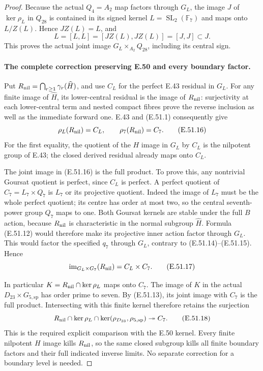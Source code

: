 \begin{proof}
Because the actual $Q_4=A_2$ map factors through $G_L$,
the image $J$ of $\ker\rho_L$ in $Q_{28}$ is contained
in its signed kernel $L=\operatorname{SL}_2(\mathbb F_7)$
and maps onto $L/Z(L)$.  Hence $JZ(L)=L$, and
\[
             L=[L,L]=[JZ(L),JZ(L)]=[J,J]\subset J.
\tag{E.51.15}
\]
This proves the actual joint image
$G_L\times_{A_2}Q_{28}$, including its central sign.

\paragraph{The complete correction preserving E.50 and every boundary factor.}
Put
$R_{\rm nil}=\bigcap_{r\ge1}\gamma_r(\widehat H)$,
and use $C_L$ for the perfect E.43 residual in $G_L$.
For any finite image of $\widehat H$, its lower-central
residual is the image of $R_{\rm nil}$: surjectivity
at each lower-central term and nested compact fibres
prove the reverse inclusion as well as the immediate
forward one.  E.43 and \textup{(E.51.1)} consequently give
\[
                   \rho_L(R_{\rm nil})=C_L,
          \qquad \rho_7(R_{\rm nil})=C_7.
\tag{E.51.16}
\]
For the first equality, the quotient of the $H$ image
in $G_L$ by $C_L$ is the nilpotent group of E.43;
the closed derived residual already maps onto $C_L$.

The joint image in \textup{(E.51.16)} is the full product.
To prove this, any nontrivial Goursat quotient is
perfect, since $C_L$ is perfect.  A perfect quotient
of $C_7=L_7\times Q_7$ is $L_7$ or its projective
quotient.  Indeed the image of $L_7$ must be the whole
perfect quotient; its centre has order at most two,
so the central seventh-power group $Q_7$ maps to one.
Both Goursat kernels are stable under the full $B$
action, because $R_{\rm nil}$ is characteristic in
the normal subgroup $\widehat H$.  Formula
\textup{(E.51.12)} would therefore make its projective
inner action factor through $G_L$.  This would factor
the specified $q_7$ through $G_L$, contrary to
\textup{(E.51.14)--(E.51.15)}.  Hence
\[
             \operatorname{im}_{G_L\times G_7}(R_{\rm nil})
                              =C_L\times C_7.
\tag{E.51.17}
\]

In particular $K=R_{\rm nil}\cap\ker\rho_L$ maps onto
$C_7$.  The image of $K$ in the actual
$D_{23}\times G_{5,\mathrm{sp}}$ has order prime to
seven.  By \textup{(E.51.13)}, its joint image with
$C_7$ is the full product.  Intersecting with this
finite kernel therefore retains the surjection
\[
 R_{\rm nil}\cap\ker\rho_L
      \cap\ker(\rho_{D_{23}},\rho_{5,\mathrm{sp}})
                      \twoheadrightarrow C_7.
\tag{E.51.18}
\]
This is the required explicit comparison with the
E.50 kernel.  Every finite nilpotent $H$ image kills
$R_{\rm nil}$, so the same closed subgroup kills
all finite boundary factors and their full indicated
inverse limits.  No separate correction for a
boundary level is needed.


\end{proof}
